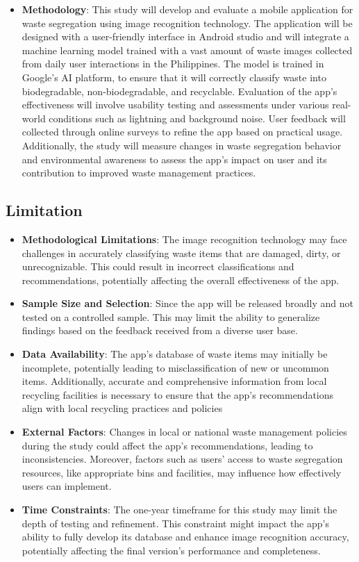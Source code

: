 \begin{itemize}
		\item \textbf{Methodology}: This study will develop and evaluate a mobile application for waste segregation using image recognition technology. The application will be designed with a user-friendly interface in Android studio and will integrate a machine learning model trained with a vast amount of waste images collected from daily user interactions in the Philippines. The model is trained in Google's AI platform, to ensure that it will correctly classify waste into biodegradable, non-biodegradable, and recyclable. Evaluation of the app's effectiveness will involve usability testing and assessments under various real-world conditions such as lightning and background noise. User feedback will collected through online surveys to refine the app based on practical usage. Additionally, the study will measure changes in waste segregation behavior and environmental awareness to assess the app's impact on user and its contribution to improved waste management practices.
	\end{itemize}
	
	\subsection{Limitation}
	\begin{itemize}
		\item \textbf{Methodological Limitations}: The image recognition technology may face challenges in accurately classifying waste items that are damaged, dirty, or unrecognizable. This could result in incorrect classifications and recommendations, potentially affecting the overall effectiveness of the app.
		
		\item \textbf{Sample Size and Selection}: Since the app will be released broadly and not tested on a controlled sample. This may limit the ability to generalize findings based on the feedback received from a diverse user base.
		
		\item \textbf{Data Availability}: The app’s database of waste items may initially be incomplete, potentially leading to misclassification of new or uncommon items. Additionally, accurate and comprehensive information from local recycling facilities is necessary to ensure that the app’s recommendations align with local recycling practices and policies
		
		\item \textbf{External Factors}: Changes in local or national waste management policies during the study could affect the app’s recommendations, leading to inconsistencies. Moreover, factors such as users' access to waste segregation resources, like appropriate bins and facilities, may influence how effectively users can implement.
		
		\item \textbf{Time Constraints}: The one-year timeframe for this study may limit the depth of testing and refinement. This constraint might impact the app’s ability to fully develop its database and enhance image recognition accuracy, potentially affecting the final version’s performance and completeness.
	\end{itemize}